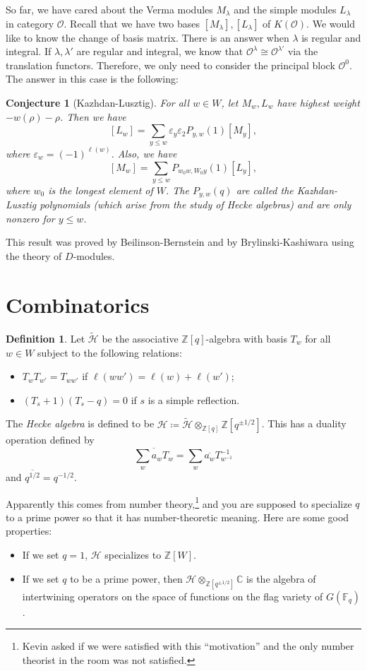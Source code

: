\documentclass[leqno, openany]{memoir}
\newtheorem{conj}[thm]{Conjecture}
\theoremstyle{definition}
\newtheorem{defn}[thm]{Definition}
\theoremstyle{remark}
\theoremstyle{plain}
\theoremstyle{definition}
\theoremstyle{remark}
\newcommand{\C}{\mathbb{C}}
\newcommand{\Z}{\mathbb{Z}}
\newcommand{\cO}{\mathcal{O}}
\newcommand{\ep}{\varepsilon}
\newcommand{\mc}[1]{\mathcal{#1}}
\newcommand{\ol}[1]{\overline{#1}}
\newcommand{\wt}[1]{\widetilde{#1}}
\begin{document}
So far, we have cared about the Verma modules $M_{\lambda}$ and the simple modules $L_{\lambda}$ in category $\cO$. Recall that we have two bases $[M_{\lambda}], [L_{\lambda}]$ of $K(\cO)$. We would like to know the change of basis matrix. There is an answer when $\lambda$ is regular and integral. If $\lambda, \lambda'$ are regular and integral, we know that $\cO^{\lambda} \cong \cO^{\lambda'}$ via the translation functors. Therefore, we only need to consider the principal block $\cO^0$. The answer in this case is the following:

\begin{conj}[Kazhdan-Lusztig]
    For all $w \in W$, let $M_{w}, L_w$ have highest weight $-w(\rho) - \rho$. Then we have
    \[ [L_w] = \sum_{y \leq w} \ep_y \ep_2 P_{y,w}(1) [M_y], \]
    where $\ep_w = (-1)^{\ell(w)}$. Also, we have
    \[ [M_w] = \sum_{y \leq w} P_{w_0 w, W_0 y}(1) [L_y], \]
    where $w_0$ is the longest element of $W$. The $P_{y,w}(q)$ are called the \textit{Kazhdan-Lusztig} polynomials (which arise from the study of Hecke algebras) and are only nonzero for $y \leq w$.
\end{conj}

This result was proved by Beilinson-Bernstein and by Brylinski-Kashiwara using the theory of $D$-modules.

\section{Combinatorics}%
\label{sec:combinatorics}

\begin{defn}
    Let $\wt{\mc{H}}$ be the associative $\Z[q]$-algebra with basis $T_w$ for all $w \in W$ subject to the following relations:
    \begin{itemize}
        \item $T_w T_{w'} = T_{ww'}$ if $\ell(ww') = \ell(w) + \ell(w')$;
        \item $(T_s + 1)(T_s - q) = 0$ if $s$ is a simple reflection.
    \end{itemize}
    The \textit{Hecke algebra} is defined to be $\mc{H} \coloneqq \wt{\mc{H}} \otimes_{\Z[q]} \Z[q^{\pm 1/2}]$. This has a duality operation defined by
    \[ \ol{\sum_w a_w T_w} = \sum_w \ol{a_w} T_{w^{-1}}^{-1} \]
    and $\ol{q^{1/2}} = q^{-1/2}$.
\end{defn}
Apparently this comes from number theory,\footnote{Kevin asked if we were satisfied with this ``motivation'' and the only number theorist in the room was not satisfied.} and you are supposed to specialize $q$ to a prime power so that it has number-theoretic meaning. Here are some good properties:
\begin{itemize}
    \item If we set $q = 1$, $\mc{H}$ specializes to $\Z[W]$.
    \item If we set $q$ to be a prime power, then $\mc{H} \otimes_{\Z[q^{\pm 1/2}]} \C$ is the algebra of intertwining operators on the space of functions on the flag variety of $G(\mathbb{F}_q)$.
\end{itemize}
\end{document}
